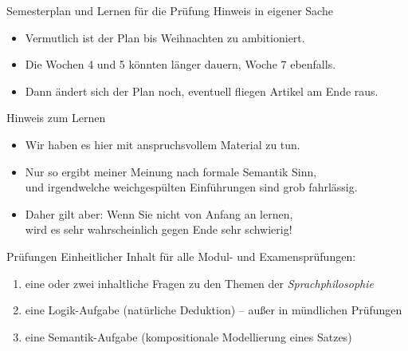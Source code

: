 \begin{frame}
  {Semesterplan und Lernen für die Prüfung}
  \onslide<+->
  \onslide<+->
  \centering 
  \alert{\large Hinweis in eigener Sache}\\
  \Halbzeile
  \begin{itemize}[<+->]
    \item Vermutlich ist der Plan bis Weihnachten zu ambitioniert.
    \item Die Wochen 4 und 5 könnten länger dauern, Woche 7 ebenfalls.
    \item Dann ändert sich der Plan noch, eventuell fliegen Artikel am Ende raus.
  \end{itemize}
  \Zeile
  \onslide<+->
  \alert{\large Hinweis zum Lernen}\\
  \Halbzeile
  \begin{itemize}[<+->]
    \item Wir haben es hier mit anspruchsvollem Material zu tun.
    \item Nur so ergibt meiner Meinung nach formale Semantik Sinn,\\
      und irgendwelche weichgespülten Einführungen sind grob fahrlässig.
    \item Daher gilt aber: Wenn Sie nicht von Anfang an lernen,\\
      wird es sehr wahrscheinlich gegen Ende sehr schwierig!
  \end{itemize}
\end{frame}

\begin{frame}
  {Prüfungen}
  \onslide<+->
  \onslide<+->
  Einheitlicher Inhalt für alle Modul- und Examensprüfungen:\\
  \Zeile
  \begin{enumerate}[<+->]
    \item eine oder zwei inhaltliche Fragen zu den Themen der \textit{Sprachphilosophie}\\
    \item eine Logik-Aufgabe (natürliche Deduktion) -- \alert{außer in mündlichen Prüfungen}
    \item eine Semantik-Aufgabe (kompositionale Modellierung eines Satzes)
  \end{enumerate}
  \Zeile
  \onslide<+->
\end{frame}

